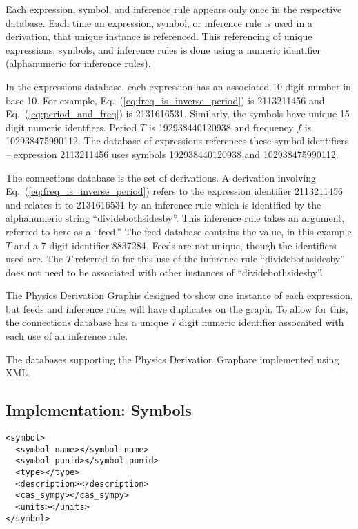 \documentclass{article}
\newcommand{\eqn}[1]{Eq.\ (\ref{#1})}
\newcommand{\pdg}{Physics Derivation Graph}
\begin{document}
\begin{multicols}{2}
Each expression, symbol, and inference rule appears only once in the respective database. Each time an expression, symbol, or inference rule is used in a derivation, that unique instance is referenced. This referencing of unique expressions, symbols, and inference rules is done using a numeric identifier (alphanumeric for inference rules).

In the expressions database, each expression has an associated 10 digit number in base 10. For example, \eqn{eq:freq_is_inverse_period} is 2113211456 and \eqn{eq:period_and_freq} is 2131616531. Similarly, the symbols have unique 15 digit numeric identfiers. Period $T$ is 192938440120938 and frequency $f$ is 102938475990112. The database of expressions references these symbol identifiers -- expression 2113211456 uses symbols 192938440120938 and 102938475990112. 

The connections database is the set of derivations. A derivation involving \eqn{eq:freq_is_inverse_period} refers to the expression identifier 2113211456 and relates it to 2131616531 by an inference rule which is identified by the alphanumeric string ``dividebothsidesby''. This inference rule takes an argument, referred to here as a ``feed.'' The feed database contains the value, in this example $T$ and a 7 digit identifier 8837284. Feeds are not unique, though the identifiers used are. The $T$ referred to for this use of the inference rule ``dividebothsidesby'' does not need to be associated with other instances of ``dividebothsidesby''. 

The \pdg is designed to show one instance of each expression, but feeds and inference rules will have duplicates on the graph. To allow for this, the connections database has a unique 7 digit numeric identifier assocaited with each use of an inference rule. 

The databases supporting the \pdg are implemented using XML\cite{2008_XML}. 

\subsection{Implementation: Symbols\label{sec:symbols}}

\begin{verbatim}
<symbol>
  <symbol_name></symbol_name>
  <symbol_punid></symbol_punid>
  <type></type>
  <description></description>
  <cas_sympy></cas_sympy>
  <units></units>
</symbol>
\end{verbatim}


\end{multicols}
\end{document}
